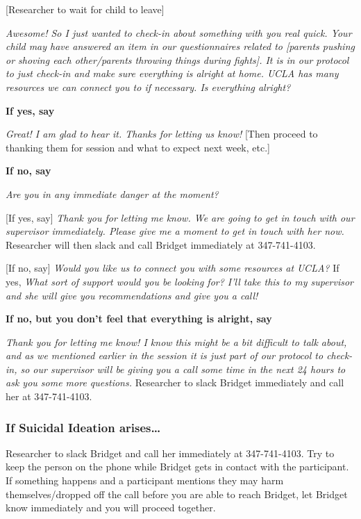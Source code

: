 \documentclass[]{book}
\begin{document}
{[}Researcher to wait for child to leave{]}

\emph{Awesome! So I just wanted to check-in about something with you real quick. Your child may have answered an item in our questionnaires related to {[}parents pushing or shoving each other/parents throwing things during fights{]}. It is in our protocol to just check-in and make sure everything is alright at home. UCLA has many resources we can connect you to if necessary. Is everything alright?}

\textbf{If yes, say}

\emph{Great! I am glad to hear it. Thanks for letting us know!} {[}Then proceed to thanking them for session and what to expect next week, etc.{]}

\textbf{If no, say}

\emph{Are you in any immediate danger at the moment?}

{[}If yes, say{]} \emph{Thank you for letting me know. We are going to get in touch with our supervisor immediately. Please give me a moment to get in touch with her now.} Researcher will then slack and call Bridget immediately at 347-741-4103.

{[}If no, say{]} \emph{Would you like us to connect you with some resources at UCLA?} If yes, \emph{What sort of support would you be looking for? I'll take this to my supervisor and she will give you recommendations and give you a call!}

\textbf{If no, but you don't feel that everything is alright, say}

\emph{Thank you for letting me know! I know this might be a bit difficult to talk about, and as we mentioned earlier in the session it is just part of our protocol to check-in, so our supervisor will be giving you a call some time in the next 24 hours to ask you some more questions.} Researcher to slack Bridget immediately and call her at 347-741-4103.

\hypertarget{if-suicidal-ideation-arises}{%
\subsubsection{If Suicidal Ideation arises\ldots{}}\label{if-suicidal-ideation-arises}}

Researcher to slack Bridget and call her immediately at 347-741-4103. Try to keep the person on the phone while Bridget gets in contact with the participant. If something happens and a participant mentions they may harm themselves/dropped off the call before you are able to reach Bridget, let Bridget know immediately and you will proceed together.
\end{document}
